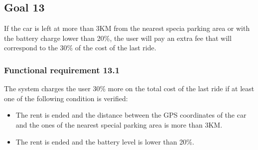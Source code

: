\subsection{Goal 13}
If the car is left at more than 3KM from the nearest specia parking area or with the battery charge lower than 20\%, the user will pay an extra fee that will correspond to the 30\% of the cost of the last ride.

\setcounter{secnumdepth}{3}
\subsubsection{Functional requirement 13.1}
The system charges the user 30\% more on the total cost of the last ride if at least one of the following condition is verified:
\begin{itemize}
	\item The rent is ended and the distance between the GPS coordinates of the car and the ones of the nearest special parking area is more than 3KM.
	\item The rent is ended and the battery level is lower than 20\%.
\end{itemize}
